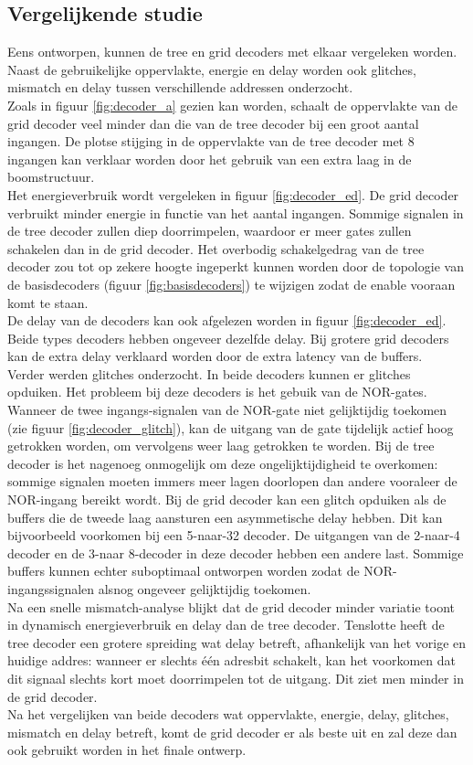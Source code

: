 \subsection{Vergelijkende studie}
Eens ontworpen, kunnen de tree en grid decoders met elkaar vergeleken worden. Naast de gebruikelijke oppervlakte, energie en delay worden ook glitches, mismatch en delay tussen verschillende addressen onderzocht. \\
Zoals in figuur \ref{fig:decoder_a} gezien kan worden, schaalt de oppervlakte van de grid decoder veel minder dan die van de tree decoder bij een groot aantal ingangen. De plotse stijging in de oppervlakte van de tree decoder met 8 ingangen kan verklaar worden door het gebruik van een extra laag in de boomstructuur. \\
Het energieverbruik wordt vergeleken in figuur \ref{fig:decoder_ed}. De grid decoder verbruikt minder energie in functie van het aantal ingangen. Sommige signalen in de tree decoder zullen diep doorrimpelen, waardoor er meer gates zullen schakelen dan in de grid decoder.  Het overbodig schakelgedrag van de tree decoder zou tot op zekere hoogte ingeperkt kunnen worden door de topologie van de basisdecoders (figuur \ref{fig:basisdecoders}) te wijzigen zodat de enable vooraan komt te staan.\\
De delay van de decoders kan ook afgelezen worden in figuur \ref{fig:decoder_ed}. Beide types decoders hebben ongeveer dezelfde delay. Bij grotere grid decoders kan de extra delay verklaard worden door de extra latency van de buffers.\\
Verder werden glitches onderzocht. In beide decoders kunnen er glitches opduiken. Het probleem bij deze decoders is het gebuik van de NOR-gates. Wanneer de twee ingangs-signalen van de NOR-gate niet gelijktijdig toekomen (zie figuur \ref{fig:decoder_glitch}), kan de uitgang van de gate tijdelijk actief hoog getrokken worden, om vervolgens weer laag getrokken te worden. Bij de tree decoder is het nagenoeg onmogelijk om deze ongelijktijdigheid te overkomen: sommige signalen moeten immers meer lagen doorlopen dan andere vooraleer de NOR-ingang bereikt wordt. Bij de grid decoder kan een glitch opduiken als de buffers die de tweede laag aansturen een asymmetische delay hebben. Dit kan bijvoorbeeld voorkomen bij een 5-naar-32 decoder. De uitgangen van de 2-naar-4 decoder en de 3-naar 8-decoder in deze decoder hebben een andere last. Sommige buffers kunnen echter suboptimaal ontworpen worden zodat de NOR-ingangssignalen alsnog ongeveer gelijktijdig toekomen.\\
Na een snelle mismatch-analyse blijkt dat de grid decoder minder variatie toont in dynamisch energieverbruik en delay dan de tree decoder. Tenslotte heeft de tree decoder een grotere spreiding wat delay betreft, afhankelijk van het vorige en huidige addres: wanneer er slechts één adresbit schakelt, kan het voorkomen dat dit signaal slechts kort moet doorrimpelen tot de uitgang. Dit ziet men minder in de grid decoder. \\
Na het vergelijken van beide decoders wat oppervlakte, energie, delay, glitches, mismatch en delay betreft, komt de grid decoder er als beste uit en zal deze dan ook gebruikt worden in het finale ontwerp.


